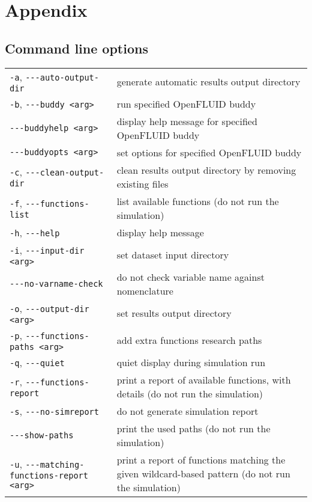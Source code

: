 \chapter{Appendix}



\section{Command line options}

\begin{center}
\begin{tabularx}{\linewidth}{lX}
\texttt{-a}, \verb?---?\texttt{auto-output-dir}&generate automatic results output directory\\
\texttt{-b}, \verb?---?\texttt{buddy <arg>}&run specified OpenFLUID buddy\\
\verb?---?\texttt{buddyhelp <arg>}&display help message for specified OpenFLUID buddy\\
\verb?---?\texttt{buddyopts <arg>}&set options for specified OpenFLUID buddy\\
\texttt{-c}, \verb?---?\texttt{clean-output-dir}&clean results output directory by removing existing files\\
\texttt{-f}, \verb?---?\texttt{functions-list}&list available functions (do not run the simulation)\\
\texttt{-h}, \verb?---?\texttt{help}&display help message\\
\texttt{-i}, \verb?---?\texttt{input-dir <arg>}&set dataset input directory\\
\verb?---?\texttt{no-varname-check}&do not check variable name against nomenclature\\
\texttt{-o}, \verb?---?\texttt{output-dir <arg>}&set results output directory\\
\texttt{-p}, \verb?---?\texttt{functions-paths <arg>}&add extra functions research paths\\
\texttt{-q}, \verb?---?\texttt{quiet}&quiet display during simulation run\\
\texttt{-r}, \verb?---?\texttt{functions-report}&print a report of available functions, with details (do not run the simulation)\\
\texttt{-s}, \verb?---?\texttt{no-simreport}&do not generate simulation report\\
\verb?---?\texttt{show-paths}&print the used paths (do not run the simulation)\\
\texttt{-u}, \verb?---?\texttt{matching-functions-report <arg>}&print a report of functions matching the given wildcard-based pattern (do not run the simulation)\\

\end{tabularx}
\end{center}
